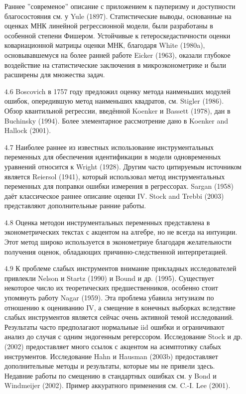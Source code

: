 \begin{itemize}
Раннее ''современое'' описание с приложением к пауперизму и доступности благосостояния см. у Yule (1897). Статистические выводы, основанные на оценках МНК линейной регрессионной модели, были разработаны в особенной степени Фишером. Устойчивые к гетероскедастичности оценки ковариационной матрицы оценки МНК, благодаря White (1980a), основывавшемуся на более ранней работе Eicker (1963), оказали глубокое воздействие на статистические заключения в микроэконометрике и были расширены для множества задач.
\item [$4.6$] Boscovich в 1757 году предложил оценку метода наименьших модулей ошибок, опередившую метод наименьших квадратов, см. Stigler (1986). Обзор квантильной регрессии, введённой Koenker и
Bassett (1978), дан в Buchinsky (1994). Более элементарное рассмотрение дано в Koenker and Hallock (2001).
\item [$4.7$] Наиболее раннее из известных использование инструментальных переменных для обеспечения идентификации в модели одновременных уравнений относится к  Wright (1928). Другим часто цитируемым источником является Reiersol (1941), который использовал метод инструментальных переменных для поправки ошибки измерения в регрессорах. Sargan (1958) даёт классическое раннее описание оценки IV.  Stock and
Trebbi (2003) представляют дополнительные ранние работы.
\item [$4.8$] Оценка методои инструментальных переменных представлена в эконометрических текстах с акцентом на алгебре, но не всегда на интуиции. Этот метод широко используется в эконометриуе благодаря желательности получения оценок, обладающих причинно-следственной интерпретацией.
\item [$4.9$] К проблеме слабых инструментов внимание прикладных исследователей привлекли Nelson и Startz (1990) и Bound и др. (1995). Существует некоторое число их теоретических предшественников, особенно стоит упомянуть работу Nagar (1959). Эта проблема убавила энтузиазм по отношению к оцениванию IV, а смещение в конечных выборках вследствие слабых инструментов является сейчас очень активной темой исследований. Результаты часто предполагают нормальные iid ошибки и ограничивают анализ до случая с одним эндогенным регерссором. Исследование Stock и др.(2002)  предоставляет много ссылок с акцентом на асимптотику слабых инструментов. Исследование Hahn и Hausman (2003b) предоставляет дополнительные методы и результаты, которые мы не привели здесь. Недавние работы по смещению в стандартных ошибках см. у Bond и Windmeijer (2002). Пример аккуратного применения см. C.-I. Lee (2001).
\end{itemize}

